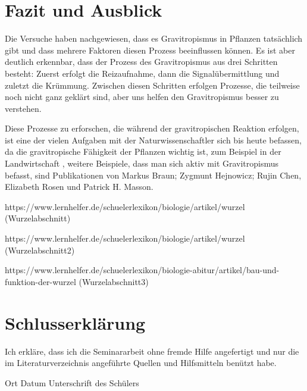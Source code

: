 \documentclass[
a4paper, 
11pt, 
ngerman,
listof=totoc,
bibliography=totocnumbered,
abstracton
]{scrreprt}
\begin{document}
\chapter{Fazit und Ausblick}

Die Versuche haben nachgewiesen, dass es Gravitropismus in Pflanzen tatsächlich gibt und dass mehrere Faktoren diesen Prozess beeinflussen können. Es ist aber deutlich erkennbar, dass der Prozess des Gravitropismus aus drei Schritten besteht: Zuerst erfolgt die Reizaufnahme, dann die Signalübermittlung und zuletzt die Krümmung. Zwischen diesen Schritten erfolgen Prozesse, die teilweise noch nicht ganz geklärt sind, aber uns helfen den Gravitropismus besser zu verstehen. 

Diese Prozesse zu erforschen, die während der gravitropischen Reaktion erfolgen, ist eine der vielen Aufgaben mit der Naturwissenschaftler sich bis heute befassen, da die gravitropische Fähigkeit der Pflanzen wichtig ist, zum Beispiel in der Landwirtschaft \parencite[343]{Chen1999}, weitere Beispiele, dass man sich aktiv mit Gravitropismus befasst, sind Publikationen von Markus Braun; Zygmunt Hejnowicz; Rujin Chen, Elizabeth Rosen und Patrick H. Masson.




\printbibliography

https://www.lernhelfer.de/schuelerlexikon/biologie/artikel/wurzel (Wurzelabschnitt)

https://www.lernhelfer.de/schuelerlexikon/biologie/artikel/wurzel (Wurzelabschnitt2)

https://www.lernhelfer.de/schuelerlexikon/biologie-abitur/artikel/bau-und-funktion-der-wurzel (Wurzelabschnitt3)




\chapter {Schlusserklärung}

Ich erkläre, dass ich die Seminararbeit ohne fremde Hilfe angefertigt und nur die im Literaturverzeichnis angeführte Quellen und Hilfsmitteln benützt habe.


Ort Datum Unterschrift des Schülers 
\end{document}
